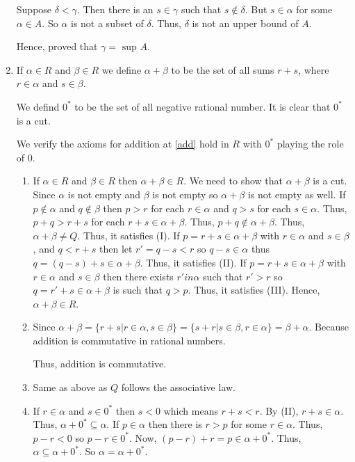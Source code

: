 \begin{enumerate}[{\bf Step 1.}]
Suppose $\delta < \gamma$. Then there is an $s \in \gamma$ such that $s \notin \delta$.
But $s \in \alpha$ for some $\alpha \in A$. So $\alpha$ is not a subset of $\delta$.
Thus, $\delta$ is not an upper bound of $A$.

Hence, proved that $\gamma = \text{ sup } A$.

\item If $\alpha \in R$ and $\beta \in R$ we define $\alpha + \beta$ to be the set of all sums $r + s$,
where $r \in \alpha$ and $s \in \beta$.

We defind $0^*$ to be the set of all negative rational number.
It is clear that $0^*$ is a cut.

We verify the axioms for addition at \ref{add} hold in $R$ with $0^*$ playing the role of $0$.

\begin{enumerate}[(\text{A}1)]
	\item If $\alpha \in R$ and $\beta \in R$ then $\alpha + \beta \in R$.
	\bigbreak \quad
	We need to show that $\alpha + \beta$ is a cut.
	Since $\alpha$ is not empty and $\beta$ is not empty so $\alpha + \beta$ is not empty as well.
	\bigbreak \quad
	If $p \notin \alpha$ and $q \notin \beta$ then $p > r$ for each $r \in \alpha$ and $q > s$ for each $s \in \alpha$.
	Thus, $p + q > r + s$ for each $r + s \in \alpha + \beta$. Thus, $p + q \notin \alpha + \beta$.
	Thus, $\alpha + \beta \neq Q$. Thus, it satisfies (I).
	\bigbreak \quad
	If $p = r + s \in \alpha + \beta$ with $r \in \alpha$ and $s \in \beta$, and $q < r + s$
	then let $r' = q - s < r$ so $q - s \in \alpha$ thus $q = (q - s) + s \in \alpha + \beta$.
	Thus, it satisfies (II).
	\bigbreak \quad
	If $p = r + s \in \alpha + \beta$ with $r \in \alpha$ and $s \in \beta$ then there exists
	$r' in \alpha$ such that $r' > r$ so $q = r' + s \in \alpha + \beta$ is such that $q > p$.
	Thus, it satisfies (III).
	\bigbreak \quad
	Hence, $\alpha + \beta \in R$.

	\item Since $\alpha + \beta = \{ r + s | r \in \alpha , s \in \beta \} = \{ s + r | s \in \beta, r \in \alpha \} = \beta + \alpha$.
	Because addition is commutative in rational numbers.

	Thus, addition is commutative.

	\item Same as above as $Q$ follows the associative law.

	\item If $r \in \alpha$ and $s \in 0^*$ then $s < 0$ which means $r + s < r$.
	By (II), $r + s \in \alpha$. Thus, $\alpha + 0^* \subseteq \alpha$.
	\bigbreak
	If $p \in \alpha$ then there is $r > p$ for some $r \in \alpha$.
	Thus, $p - r < 0$ so $p - r \in 0^*$. Now, $(p - r) + r = p \in \alpha + 0^*$.
	Thus, $\alpha \subseteq \alpha + 0^*$.
	\bigbreak
	So $\alpha = \alpha + 0^*$.


\end{enumerate}
\end{enumerate}
